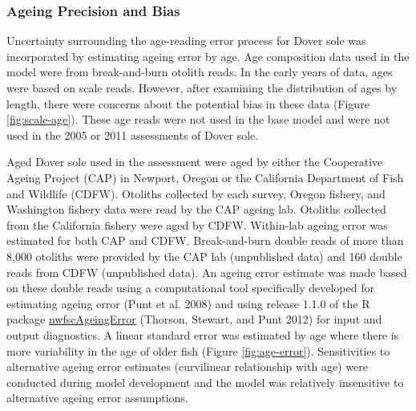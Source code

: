 \documentclass[11pt,
  english,
  a4paper,
]{article}
\begin{document}
\leavevmode\tagmcend\tagstructend\par


\hypertarget{ageing-precision-and-bias}{%
\subsubsection{Ageing Precision and Bias}\label{ageing-precision-and-bias}}

\leavevmode\tagmcend\tagstructend


Uncertainty surrounding the age-reading error process for Dover sole was incorporated by estimating ageing error by age. Age composition data used in the model were from break-and-burn otolith reads. In the early years of data, ages were based on scale reads. However, after examining the distribution of ages by length, there were concerns about the potential bias in these data (Figure \ref{fig:scale-age}). These age reads were not used in the base model and were not used in the 2005 or 2011 assessments of Dover sole.

\leavevmode\tagmcend\tagstructend\par


Aged Dover sole used in the assessment were aged by either the Cooperative Ageing Project (CAP) in Newport, Oregon or the California Department of Fish and Wildlife (CDFW). Otoliths collected by each survey, Oregon fishery, and Washington fishery data were read by the CAP ageing lab. Otoliths collected from the California fishery were aged by CDFW. Within-lab ageing error was estimated for both CAP and CDFW. Break-and-burn double reads of more than 8,000 otoliths were provided by the CAP lab (unpublished data) and 160 double reads from CDFW (unpublished data). An ageing error estimate was made based on these double reads using a computational tool specifically developed for estimating ageing error {(Punt et al. 2008)\leavevmode\tagmcend\tagstructend} and using release 1.1.0 of the R package \href{https://github.com/nwfsc-assess/nwfscAgeingError}{nwfscAgeingError} {(Thorson, Stewart, and Punt 2012)\leavevmode\tagmcend\tagstructend} for input and output diagnostics. A linear standard error was estimated by age where there is more variability in the age of older fish (Figure \ref{fig:age-error}). Sensitivities to alternative ageing error estimates (curvilinear relationship with age) were conducted during model development and the model was relatively insensitive to alternative ageing error assumptions.
\end{document}
